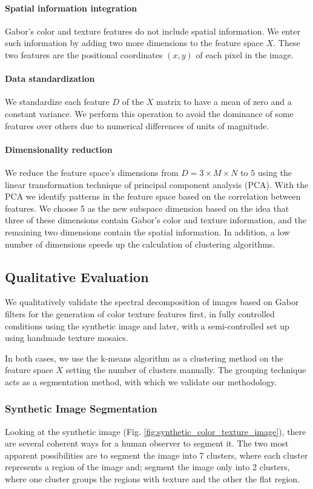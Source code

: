\documentclass[journal]{IEEEtran}
\begin{document}
\paragraph{Spatial information integration}
Gabor's color and texture features do not include spatial information. We enter such information by adding two more dimensions to the feature space $X$. These two features are the positional coordinates $(x, y)$ of each pixel in the image. 

\paragraph{Data standardization}
We standardize each feature $D$ of the $X$ matrix to have a mean of zero and a constant variance. We perform this operation to avoid the dominance of some features over others due to numerical differences of units of magnitude.

\paragraph{Dimensionality reduction}
We reduce the feature space's dimensions from $D =3 \times M \times N$ to $5$ using the linear transformation technique of principal component analysis (PCA). With the PCA we identify patterns in the feature space based on the correlation between features. We choose 5 as the new subspace dimension based on the idea that three of these dimensions contain Gabor's color and texture information, and the remaining two dimensions contain the spatial information. In addition, a low number of dimensions speeds up the calculation of clustering algorithms.

\subsection{Qualitative Evaluation}
We qualitatively validate the spectral decomposition of images based on Gabor filters for the generation of color texture features first, in fully controlled conditions using the synthetic image and later, with a semi-controlled set up using handmade texture mosaics.

In both cases, we use the k-means algorithm as a clustering method on the feature space $X$ setting the number of clusters manually. The grouping technique acts as a segmentation method, with which we validate our methodology.

\subsubsection{Synthetic Image Segmentation}
Looking at the synthetic image (Fig. \ref{fig:synthetic_color_texture_image}),  there are several coherent ways for a human observer to segment it. The two most apparent possibilities are to segment the image into 7 clusters, where each cluster represents a region of the image and; segment the image only into 2 clusters, where one cluster groups the regions with texture and the other the flat region. 
\end{document}
